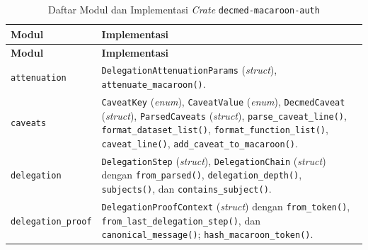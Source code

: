\documentclass[bahasa, 12pt, a4paper, onecolumn, oneside, final]{report}
\begin{document}
\begingroup
\small
\begin{longtable}{|>{\raggedright\arraybackslash}p{}|>{\raggedright\arraybackslash}p{}|}
	\caption{Daftar Modul dan Implementasi \textit{Crate} \texttt{decmed-macaroon-auth}}
	\label{tab:modul-crate-decmed-macaroon-auth}                                                                                                                                                                                                                                                                                                      \\
	\hline
	\textbf{Modul} & \textbf{Implementasi}                                                                                                                                                                                                                                                                                                            \\
	\hline
	\endfirsthead
	\hline
	\textbf{Modul} & \textbf{Implementasi}                                                                                                                                                                                                                                                                                                            \\
	\hline
	\endhead

	\texttt{attenuation}
	               & \texttt{DelegationAttenuationParams} (\textit{struct}), \texttt{attenuate\_macaroon()}.
	\\ \hline

	\texttt{caveats}
	               & \texttt{CaveatKey} (\textit{enum}), \texttt{CaveatValue} (\textit{enum}), \texttt{DecmedCaveat} (\textit{struct}), \texttt{ParsedCaveats} (\textit{struct}), \texttt{parse\_caveat\_line()}, \texttt{format\_dataset\_list()}, \texttt{format\_function\_list()}, \texttt{caveat\_line()}, \texttt{add\_caveat\_to\_macaroon()}.
	\\ \hline

	\texttt{delegation}
	               & \texttt{DelegationStep} (\textit{struct}), \texttt{DelegationChain} (\textit{struct}) dengan \texttt{from\_parsed()}, \texttt{delegation\_depth()}, \texttt{subjects()}, dan \texttt{contains\_subject()}.
	\\ \hline

	\texttt{delegation\_\newline proof}
	               & \texttt{DelegationProofContext} (\textit{struct}) dengan
	\texttt{from\_token()}, \texttt{from\_last\_delegation\_step()},
	dan \texttt{canonical\_message()}; \texttt{hash\_macaroon\_token()}.
	\\ \hline


\end{longtable}
\end{document}
